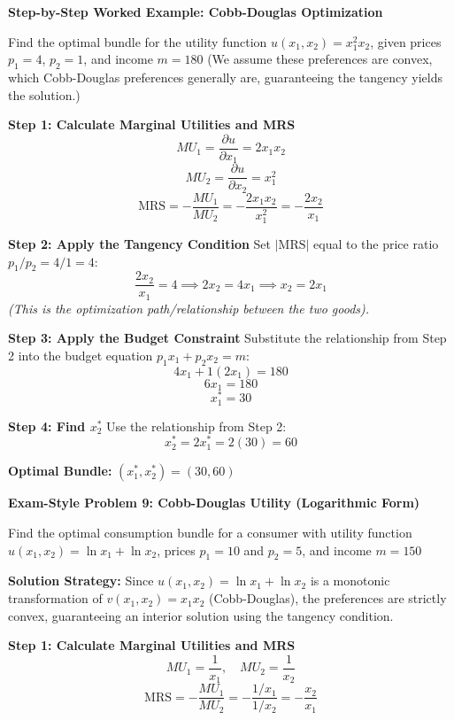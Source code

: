 \documentclass{article}
\begin{document}
\vspace{0.5em}

\vspace{0.5em}

\noindent\textbf{Step-by-Step Worked Example: Cobb-Douglas Optimization}

Find the optimal bundle for the utility function $u(x_1, x_2) = x_1^2 x_2$, given prices $p_1=4$, $p_2=1$, and income $m=180$ (We assume these preferences are convex, which Cobb-Douglas preferences generally are, guaranteeing the tangency yields the solution.)

\textbf{Step 1: Calculate Marginal Utilities and MRS}
\[ MU_1 = \frac{\partial u}{\partial x_1} = 2x_1 x_2 \]
\[ MU_2 = \frac{\partial u}{\partial x_2} = x_1^2 \]
\[ \text{MRS} = -\frac{MU_1}{MU_2} = -\frac{2x_1 x_2}{x_1^2} = -\frac{2x_2}{x_1} \]

\textbf{Step 2: Apply the Tangency Condition}
Set $|\text{MRS}|$ equal to the price ratio $p_1/p_2 = 4/1 = 4$:
\[ \frac{2x_2}{x_1} = 4 \implies 2x_2 = 4x_1 \implies x_2 = 2x_1 \]
\textit{(This is the optimization path/relationship between the two goods).}

\textbf{Step 3: Apply the Budget Constraint}
Substitute the relationship from Step 2 into the budget equation $p_1 x_1 + p_2 x_2 = m$:
\[ 4x_1 + 1(2x_1) = 180 \]
\[ 6x_1 = 180 \]
\[ x_1^* = 30 \]

\textbf{Step 4: Find $x_2^*$}
Use the relationship from Step 2:
\[ x_2^* = 2x_1^* = 2(30) = 60 \]

\textbf{Optimal Bundle:} $(x_1^*, x_2^*) = (30, 60)$

\vspace{0.5em}

\vspace{0.5em}

\noindent\textbf{Exam-Style Problem 9: Cobb-Douglas Utility (Logarithmic Form)}

Find the optimal consumption bundle for a consumer with utility function $u(x_1, x_2) = \ln x_1 + \ln x_2$, prices $p_1=10$ and $p_2=5$, and income $m=150$

\textbf{Solution Strategy:} Since $u(x_1, x_2) = \ln x_1 + \ln x_2$ is a monotonic transformation of $v(x_1, x_2) = x_1 x_2$ (Cobb-Douglas), the preferences are strictly convex, guaranteeing an interior solution using the tangency condition.

\textbf{Step 1: Calculate Marginal Utilities and MRS}
\[ MU_1 = \frac{1}{x_1}, \quad MU_2 = \frac{1}{x_2} \]
\[ \text{MRS} = -\frac{MU_1}{MU_2} = -\frac{1/x_1}{1/x_2} = -\frac{x_2}{x_1} \]
\end{document}
